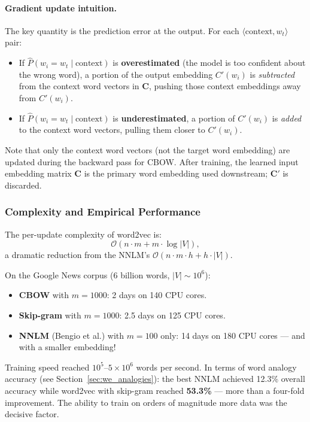 \documentclass[11pt,a4paper]{article}
\begin{document}
\paragraph{Gradient update intuition.} The key quantity is the prediction error at the output. For each $\langle\text{context}, w_t\rangle$ pair:
\begin{itemize}
  \item If $\hat{P}(w_i = w_t \mid \text{context})$ is \textbf{overestimated} (the model is too confident about the wrong word), a portion of the output embedding $C'(w_i)$ is \emph{subtracted} from the context word vectors in $\mathbf{C}$, pushing those context embeddings away from $C'(w_i)$.
  \item If $\hat{P}(w_i = w_t \mid \text{context})$ is \textbf{underestimated}, a portion of $C'(w_i)$ is \emph{added} to the context word vectors, pulling them closer to $C'(w_i)$.
\end{itemize}
Note that only the context word vectors (not the target word embedding) are updated during the backward pass for CBOW. After training, the learned input embedding matrix $\mathbf{C}$ is the primary word embedding used downstream; $\mathbf{C}'$ is discarded.

\subsubsection{Complexity and Empirical Performance}

The per-update complexity of word2vec is:
\[
  \mathcal{O}(n \cdot m + m \cdot \log|V|),
\]
a dramatic reduction from the NNLM's $\mathcal{O}(n \cdot m \cdot h + h \cdot |V|)$.

On the Google News corpus (6 billion words, $|V| \sim 10^6$):
\begin{itemize}
  \item \textbf{CBOW} with $m = 1000$: 2 days on 140 CPU cores.
  \item \textbf{Skip-gram} with $m = 1000$: 2.5 days on 125 CPU cores.
  \item \textbf{NNLM} (Bengio et al.) with $m = 100$ only: 14 days on 180 CPU cores — and with a smaller embedding!
\end{itemize}

Training speed reached $10^5$--$5\times 10^6$ words per second. In terms of word analogy accuracy (see Section~\ref{sec:we_analogies}): the best NNLM achieved 12.3\% overall accuracy while word2vec with skip-gram reached \textbf{53.3\%} — more than a four-fold improvement. The ability to train on orders of magnitude more data was the decisive factor.
\end{document}
